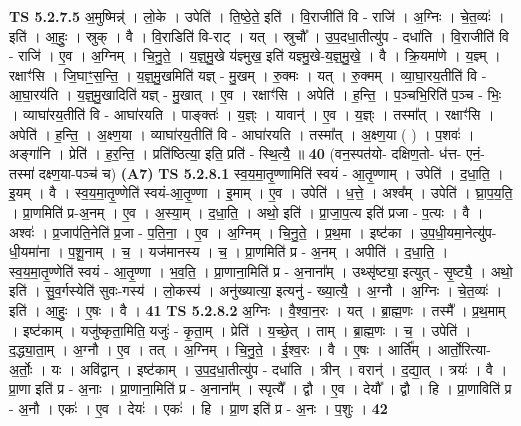 \documentclass[17pt]{extarticle}
\begin{document}
                  \newline
                                \textbf{ TS 5.2.7.5} \newline
                  अ॒मुष्मिन्न्॑ । लो॒के । उपेति॑ । ति॒ष्ठे॒ते॒ इति॑ । वि॒राजीति॑ वि - राजि॑ । अ॒ग्निः । चे॒त॒व्यः॑ । इति॑ । आ॒हुः॒ । स्रुक् । वै । वि॒राडिति॑ वि-राट् । यत् । स्रुचौ᳚ । उ॒प॒दधा॒तीत्यु॑प - दधा॑ति । वि॒राजीति॑ वि - राजि॑ । ए॒व । अ॒ग्निम् । चि॒नु॒ते॒ । य॒ज्ञ्॒मु॒खे य॑ज्ञ्मुख॒ इति॑ यज्ञ्मु॒खे-य॒ज्ञ्॒मु॒खे॒ । वै । क्रि॒यमा॑णे । य॒ज्ञ्म् । रक्षाꣳ॑सि । जि॒घाꣳ॒॒स॒न्ति॒ । य॒ज्ञ्॒मु॒खमिति॑ यज्ञ् - मु॒खम् । रु॒क्मः । यत् । रु॒क्मम् । व्या॒घा॒रय॒तीति॑ वि - आ॒घा॒रय॑ति । य॒ज्ञ्॒मु॒खादिति॑ यज्ञ् - मु॒खात् । ए॒व । रक्षाꣳ॑सि । अपेति॑ । ह॒न्ति॒ । प॒ञ्चभि॒रिति॑ प॒ञ्च - भिः॒ । व्याघा॑रय॒तीति॑ वि - आघा॑रयति । पाङ्क्तः॑ । य॒ज्ञ्ः । यावान्॑ । ए॒व । य॒ज्ञ्ः । तस्मा᳚त् । रक्षाꣳ॑सि । अपेति॑ । ह॒न्ति॒ । अ॒क्ष्ण॒या । व्याघा॑रय॒तीति॑ वि - आघा॑रयति । तस्मा᳚त् । अ॒क्ष्ण॒या ( ) । प॒शवः॑ । अङ्गा॑नि । प्रेति॑ । ह॒र॒न्ति॒ । प्रति॑ष्ठित्या॒ इति॒ प्रति॑ - स्थि॒त्यै॒ ॥ \textbf{  40 } \newline
                  \newline
                       (वन॒स्पत॑यो- दक्षिण॒तो- ध॑त्त- एनं॒- तस्मा॑ दक्ष्ण॒या-पञ्च॑ च)  \textbf{(A7)} \newline \newline
                                \textbf{ TS 5.2.8.1} \newline
                  स्व॒य॒मा॒तृ॒ण्णामिति॑ स्वयं - आ॒तृ॒ण्णाम् । उपेति॑ । द॒धा॒ति॒ । इ॒यम् । वै । स्व॒य॒मा॒तृ॒ण्णेति॑ स्वयं-आ॒तृ॒ण्णा । इ॒माम् । ए॒व । उपेति॑ । ध॒त्ते॒ । अश्व᳚म् । उपेति॑ । घ्रा॒प॒य॒ति॒ । प्रा॒णमिति॑ प्र-अ॒नम् । ए॒व । अ॒स्या॒म् । द॒धा॒ति॒ । अथो॒ इति॑ । प्रा॒जा॒प॒त्य इति॑ प्रजा - प॒त्यः । वै । अश्वः॑ । प्र॒जाप॑ति॒नेति॑ प्र॒जा - प॒ति॒ना॒ । ए॒व । अ॒ग्निम् । चि॒नु॒ते॒ । प्र॒थ॒मा । इष्ट॑का । उ॒प॒धी॒यमा॒नेत्यु॑प-धी॒यमा॑ना । प॒शू॒नाम् । च॒ । यज॑मानस्य । च॒ । प्रा॒णमिति॑ प्र - अ॒नम् । अपीति॑ । द॒धा॒ति॒ । स्व॒य॒मा॒तृ॒ण्णेति॑ स्वयं - आ॒तृ॒ण्णा । भ॒व॒ति॒ । प्रा॒णाना॒मिति॑ प्र - अ॒नाना᳚म् । उथ्सृ॑ष्ट्या॒ इत्युत् - सृ॒ष्ट्यै॒ । अथो॒ इति॑ । सु॒व॒र्गस्येति॑ सुवः-गस्य॑ । लो॒कस्य॑ । अनु॑ख्यात्या॒ इत्यनु॑ - ख्या॒त्यै॒ । अ॒ग्नौ । अ॒ग्निः । चे॒त॒व्यः॑ । इति॑ । आ॒हुः॒ । ए॒षः । वै । \textbf{  41} \newline
                  \newline
                                \textbf{ TS 5.2.8.2} \newline
                  अ॒ग्निः । वै॒श्वा॒न॒रः । यत् । ब्रा॒ह्म॒णः । तस्मै᳚ । प्र॒थ॒माम् । इष्ट॑काम् । यजु॑ष्कृता॒मिति॒ यजुः॑ - कृ॒ता॒म् । प्रेति॑ । य॒च्छे॒त् । ताम् । ब्रा॒ह्म॒णः । च॒ । उपेति॑ । द॒द्ध्या॒ता॒म् । अ॒ग्नौ । ए॒व । तत् । अ॒ग्निम् । चि॒नु॒ते॒ । ई॒श्व॒रः । वै । ए॒षः । आर्ति᳚म् । आर्तो॒रित्या-अ॒र्तोः॒ । यः । अवि॑द्वान् । इष्ट॑काम् । उ॒प॒द॒धा॒तीत्यु॑प - दधा॑ति । त्रीन् । वरान्॑ । द॒द्या॒त् । त्रयः॑ । वै । प्रा॒णा इति॑ प्र - अ॒नाः । प्रा॒णाना॒मिति॑ प्र - अ॒नाना᳚म् । स्पृत्यै᳚ । द्वौ । ए॒व । देयौ᳚ । द्वौ । हि । प्रा॒णाविति॑ प्र - अ॒नौ । एकः॑ । ए॒व । देयः॑ । एकः॑ । हि । प्रा॒ण इति॑ प्र - अ॒नः । प॒शुः । \textbf{  42} \newline
\end{document}
